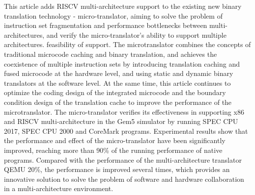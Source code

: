 This article adds RISCV multi-architecture support to the existing new binary translation technology - micro-translator, aiming to solve the problem of instruction set fragmentation and performance bottlenecks between multi-architectures, and verify the micro-translator's ability to support multiple architectures. feasibility of support.
The microtranslator combines the concepts of traditional microcode caching and binary translation, and achieves the coexistence of multiple instruction sets by introducing translation caching and fused microcode at the hardware level, and using static and dynamic binary translators at the software level.
At the same time, this article continues to optimize the coding design of the integrated microcode and the boundary condition design of the translation cache to improve the performance of the microtranslator.
The micro-translator verifies its effectiveness in supporting x86 and RISCV multi-architecture in the Gem5 simulator by running SPEC CPU 2017, SPEC CPU 2000 and CoreMark programs.
Experimental results show that the performance and effect of the micro-translator have been significantly improved, reaching more than 90\% of the running performance of native programs.
Compared with the performance of the multi-architecture translator QEMU 20\%, the performance is improved several times, which provides an innovative solution to solve the problem of software and hardware collaboration in a multi-architecture environment.


